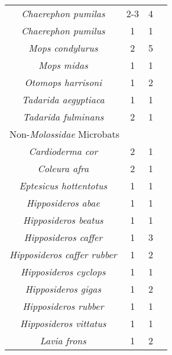 \documentclass[9pt,twoside,lineno]{pnas-new}
\begin{document}
\begin{longtable}{cccp{5cm}}
\hline \hline
\textit{Chaerephon pumilas} & 2-3 & 4 & \cite{vanderMerwe1987AdaptiveS,Happold1989ReproductionAfrica.,MUTERE1973ReproductionMolossidae,Mcwilliam1987TheEnvironment}\\
\textit{Chaerephon pumilus} & 1 & 1 & \cite{Monadjem1998NotesRecords}\\
\textit{Mops condylurus} & 2 & 5 & \cite{Vivier1997Africa,Happold1989ReproductionAfrica.,OShea1980EcologicalCommunity,MUTERE1973ReproductionMolossidae}\\
\textit{Mops midas} & 1 & 1 & \cite{Smithers1971TheBotswana}\\
\textit{Otomops harrisoni} & 1 & 2 & \cite{MUTERE1973ReproductionMolossidae}\\
\textit{Tadarida aegyptiaca} & 1 & 1 & \cite{Bernard1995SeasonallyTemperate...}\\
\textit{Tadarida fulminans} & 2 & 1 & \cite{Cotterill1993SeasonallyZimbabwe}\\
\hline
\multicolumn{4}{l}{Non-\textit{Molossidae} Microbats} \\
\hline \hline
\textit{Cardioderma cor} & 2 & 1 & \cite{Vaughan1976NocturnalCor}\\
\textit{Coleura afra} & 2 & 1 & \cite{Mcwilliam1987TheEnvironment}\\
\textit{Eptesicus hottentotus} & 1 & 1 & \cite{Happold2013MammalsBats}\\
\textit{Hipposideros abae} & 1 & 1 & \cite{Verschuren1957EcologieChiropteres}\\
\textit{Hipposideros beatus} & 1 & 1 & \cite{Brosset1966LaChiropteres}\\
\textit{Hipposideros caffer} & 1 & 3 & \cite{Bernard1982FemaleAfrica,Ansell1986SomeAfrica,Menzies1973ANigeria}\\
\textit{Hipposideros caffer rubber} & 1 & 2 & \cite{Verschuren1957EcologieChiropteres,Wolton1982EcologicalMicrochiroptera}\\
\textit{Hipposideros cyclops
} & 1 & 1 & \cite{Verschuren1957EcologieChiropteres}\\
\textit{Hipposideros gigas} & 1 & 2 & \cite{Mcwilliam1982AdaptiveKenya,Brosset1969LaGabon}\\
\textit{Hipposideros rubber} & 1 & 1 & \cite{Howell1976AnTanzania}\\
\textit{Hipposideros vittatus} & 1 & 1 & \cite{Cotterill1999ReproductiveConservation}\\
\textit{Lavia frons} & 1 & 2 & \cite{Verschuren1957EcologieChiropteres,Vaughan1986SeasonalityYellow-Winged}\\

\end{longtable}
\end{document}
